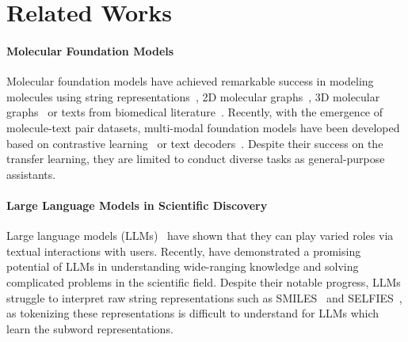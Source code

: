 \vspace{-0.09in}
\section{Related Works}
\vspace{-0.05in}
\paragraph{Molecular Foundation Models}
Molecular foundation models have achieved remarkable success in modeling molecules using string representations~\cite{chithrananda2020chemberta,fabian2020molbert,wang2019smilesbert,irwin2022chemformer}, 2D molecular graphs~\cite{ying2021graphormer,mendez2024mole}, 3D molecular graphs~\cite{zhou2023unimol,lu2024unimol+} or texts from biomedical literature~\cite{gu2021domain,lee2020biobert,beltagy2019scibert}. Recently, with the emergence of molecule-text pair datasets, multi-modal foundation models have been developed based on contrastive learning~\cite{su2022momu,liu2023moleculestm} or text decoders~\cite{edwards-etal-2022-molt5,zeng2022kvplm,luo2023molfm,christofidellis2023text+chemt5,liu2024gitmol}. Despite their success on the transfer learning, they are limited to conduct diverse tasks as general-purpose assistants.

\vspace{-0.05in}
\paragraph{Large Language Models in Scientific Discovery}
Large language models (LLMs)~\cite{openai2024gpt4,openai2024gpt4ocard,touvron2023llama2,grattafiori2024llama3} have shown that they can play varied roles via textual interactions with users. Recently, \citet{ai4science2023impactlargelanguagemodels} have demonstrated a promising potential of LLMs in understanding wide-ranging knowledge and solving complicated problems in the scientific field. Despite their notable progress, LLMs struggle to interpret raw string representations such as SMILES~\cite{weininger1988smiles} and SELFIES~\cite{krenn2020selfies}, as tokenizing these representations is difficult to understand for LLMs which learn the subword representations.

\vspace{-0.05in}
